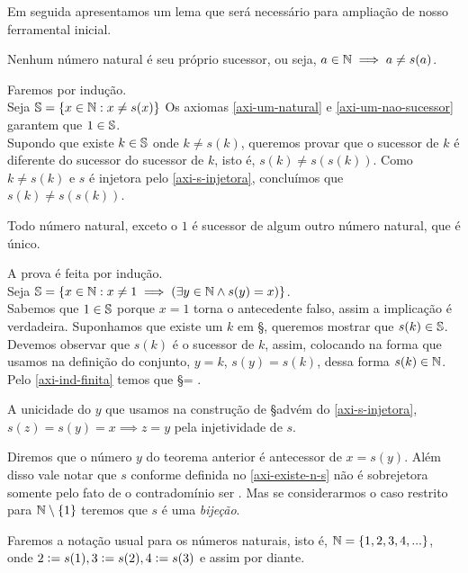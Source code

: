 \documentclass[../main.tex]{subfiles}
\begin{document}
Em seguida apresentamos um lema que será necessário para ampliação de nosso ferramental inicial.
\begin{lema}\label{n-dif-sucessor}
    Nenhum número natural é seu próprio sucessor, ou seja, $a \in \N \implies a \neq s(a) $.
\end{lema}
\begin{dem}
    Faremos por indução.\\
    Seja $\S = \{x \in \N : x \neq s(x) \}$
    Os axiomas \ref{axi-um-natural} e \ref{axi-um-nao-sucessor} garantem que $1 \in \S$.\\
    Supondo que existe $ k \in \S$ onde $ k \neq s(k)$, queremos provar que o sucessor de $k$ é diferente do sucessor do sucessor de $k$, isto é, $s(k) \neq s(s(k))$. Como $k \neq s(k)$ e $s$ é injetora pelo \cref{axi-s-injetora}, concluímos que $s(k) \neq s(s(k))$.
\end{dem}
\begin{teo}\label{nat-suc-unico}
    Todo número natural, exceto o $1$ é sucessor de algum outro número natural, que é único.
\end{teo}
\begin{dem}
    A prova é feita por indução. \\ 
    Seja $\S = \{x \in \N : x \neq 1 \implies (\exists y \in \N \land s(y) = x) \}$.\\
    Sabemos que $1 \in \S$ porque $x = 1$ torna o antecedente falso, assim a implicação é verdadeira. Suponhamos que existe um $k$ em \S, queremos mostrar que $s(k) \in \S$. Devemos observar que $s(k)$ é o sucessor de $k$, assim, colocando na forma que usamos na definição do conjunto,
    $y = k$, $s(y) = s(k)$, dessa forma $s(k) \in \N$. Pelo \cref{axi-ind-finita} temos que \S = \N.

    A unicidade do $y$ que usamos na construção de \S advém do \cref{axi-s-injetora}, $s(z) = s(y) = x \implies z = y$ pela injetividade de $s$.
\end{dem}
\begin{obs}
    Diremos que o número $y$ do teorema anterior é antecessor de $x = s(y)$. Além disso vale notar que $s$ conforme definida no \cref{axi-existe-n-s} não é sobrejetora somente pelo fato de o contradomínio ser \N. Mas se considerarmos o caso restrito para $\N \setminus \{1\}$ 
    teremos que $s$ é uma \emph{bijeção}.
\end{obs}

Faremos a notação usual para os números naturais, isto é, $\N = \{ 1, 2, 3, 4, ...\}$, onde $2 \defeq s(1), 3 \defeq s(2), 4 \defeq s(3)$ e assim por diante.
\end{document}
